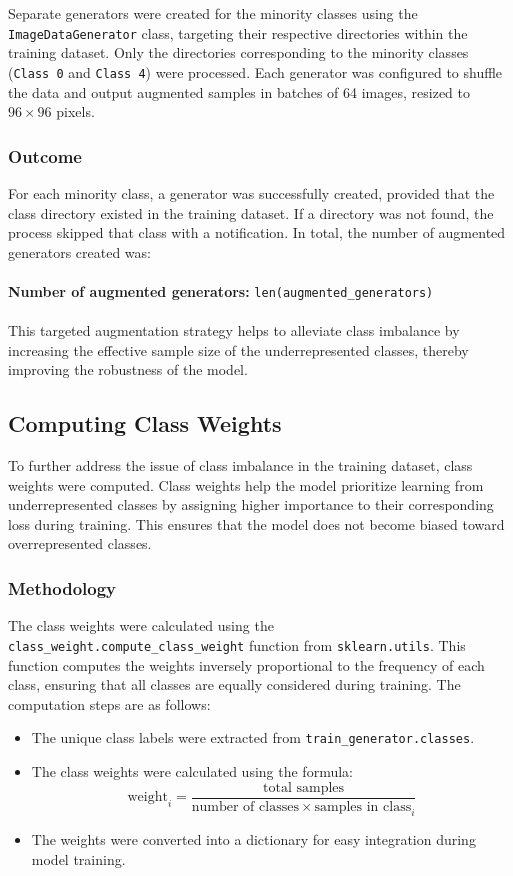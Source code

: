 \documentclass{article}
\begin{document}
Separate generators were created for the minority classes using the \texttt{ImageDataGenerator} class, targeting their respective directories within the training dataset. Only the directories corresponding to the minority classes (\texttt{Class 0} and \texttt{Class 4}) were processed. Each generator was configured to shuffle the data and output augmented samples in batches of 64 images, resized to \(96 \times 96\) pixels.

\subsubsection{Outcome}

For each minority class, a generator was successfully created, provided that the class directory existed in the training dataset. If a directory was not found, the process skipped that class with a notification. In total, the number of augmented generators created was:
\\\\
\textbf{Number of augmented generators:} \texttt{len(augmented\_generators)}
\\\\
This targeted augmentation strategy helps to alleviate class imbalance by increasing the effective sample size of the underrepresented classes, thereby improving the robustness of the model.

\subsection{Computing Class Weights}

To further address the issue of class imbalance in the training dataset, class weights were computed. Class weights help the model prioritize learning from underrepresented classes by assigning higher importance to their corresponding loss during training. This ensures that the model does not become biased toward overrepresented classes.

\subsubsection{Methodology}

The class weights were calculated using the \texttt{class\_weight.compute\_class\_weight} function from \texttt{sklearn.utils}. This function computes the weights inversely proportional to the frequency of each class, ensuring that all classes are equally considered during training. The computation steps are as follows:
\begin{itemize}
    \item The unique class labels were extracted from \texttt{train\_generator.classes}.
    \item The class weights were calculated using the formula:
    \[
    \text{weight}_{i} = \frac{\text{total samples}}{\text{number of classes} \times \text{samples in class}_{i}}
    \]
    \item The weights were converted into a dictionary for easy integration during model training.
\end{itemize}
\end{document}
